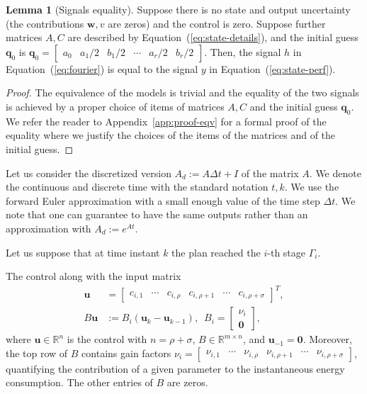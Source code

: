 \documentclass[letterpaper,10pt,conference]{ieeeconf}
\theoremstyle{definition}
\newtheorem{lem}[thm]{Lemma}
\begin{document}
\begin{lem}[Signals equality]\label{lem:eqv}Suppose there is no state and output uncertainty (the contributions $\mathbf{w},v$ are zeros) and the control is zero. Suppose further matrices $A,C$ are described by Equation~(\ref{eq:state-details}), and the initial guess $\mathbf{q}_0$ is $\mathbf{q}_0=\begin{bmatrix}a_0 & a_1/2 & b_1/2 & \cdots & a_r/2 & b_r/2\end{bmatrix}$. Then, the signal $h$ in Equation~(\ref{eq:fourier}) is equal to the signal $y$ in Equation~(\ref{eq:state-perf}).
\end{lem}
\begin{proof}
The equivalence of the models is trivial and the equality of the two signals is achieved by a proper choice of items of matrices $A,C$ and the initial guess $\mathbf{q}_0$. We refer the reader to Appendix~\ref{app:proof-eqv} for a formal proof of the equality where we justify the choices of the items of the matrices and of the initial guess. 
\end{proof}

Let us consider the discretized version $A_d:=A\Delta t+I$ of the matrix $A$. We denote the continuous and discrete time with the standard notation $t,k$. We use the forward Euler approximation with a small enough value of the time step $\Delta t$. We note that one can guarantee to have the same outputs rather than an approximation with $A_d:=e^{At}$.

Let us suppose that at time instant $k$ the plan reached the $i$-th stage $\Gamma_i$.

The control along with the input matrix
\begin{equation}\label{eq:state-control}\begin{split}
  \mathbf{u}&=\begin{bmatrix}c_{i,1} & \cdots & c_{i,\rho} & c_{i,\rho+1} & \cdots & c_{i,\rho+\sigma}\end{bmatrix}^T,\\
  B\mathbf{u}&:=B_i(\mathbf{u}_k-\mathbf{u}_{k-1}),\,\,\,B_i=\left[\begin{array}{c} \nu_i\\\mathbf{0}\end{array}\right],
\end{split}\end{equation}
where $\mathbf{u}\in\mathbb{R}^n$ is the control with $n=\rho+\sigma$, $B\in\mathbb{R}^{m\times n}$, and $\mathbf{u}_{-1}=\mathbf{0}$. Moreover, the top row of $B$ contains gain factors $\nu_i=\begin{bmatrix}\nu_{i,1} & \cdots & \nu_{i,\rho} & \nu_{i,\rho + 1}& \cdots & \nu_{i,\rho+\sigma}\end{bmatrix}$, quantifying the contribution of a given parameter to the instantaneous energy consumption. The other entries of $B$ are zeros. 
\end{document}

